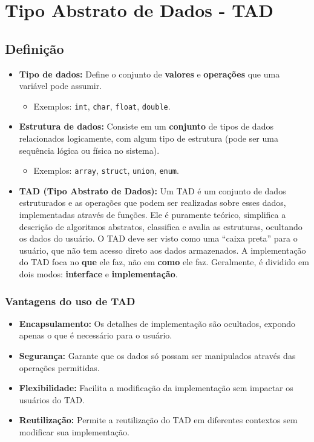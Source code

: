 \section{Tipo Abstrato de Dados - TAD}

\subsection{Definição}

\begin{itemize}
    \item \textbf{Tipo de dados:} Define o conjunto de \textbf{valores} e \textbf{operações} que uma variável pode assumir.
    \begin{itemize}
        \item Exemplos: \texttt{int}, \texttt{char}, \texttt{float}, \texttt{double}.
    \end{itemize}

    \item \textbf{Estrutura de dados:} Consiste em um \textbf{conjunto} de tipos de dados relacionados logicamente, com algum tipo de estrutura (pode ser uma sequência lógica ou física no sistema).
    \begin{itemize}
        \item Exemplos: \texttt{array}, \texttt{struct}, \texttt{union}, \texttt{enum}.
    \end{itemize}

    \item \textbf{TAD (Tipo Abstrato de Dados):} Um TAD é um conjunto de dados estruturados e as operações que podem ser realizadas sobre esses dados, implementadas através de funções. Ele é puramente teórico, simplifica a descrição de algoritmos abstratos, classifica e avalia as estruturas, ocultando os dados do usuário. O TAD deve ser visto como uma ``caixa preta'' para o usuário, que não tem acesso direto aos dados armazenados. A implementação do TAD foca no \textbf{que} ele faz, não em \textbf{como} ele faz. Geralmente, é dividido em dois modos: \textbf{interface} e \textbf{implementação}.
\end{itemize}

\subsubsection{Vantagens do uso de TAD}

\begin{itemize}
    \item \textbf{Encapsulamento:} Os detalhes de implementação são ocultados, expondo apenas o que é necessário para o usuário.
    \item \textbf{Segurança:} Garante que os dados só possam ser manipulados através das operações permitidas.
    \item \textbf{Flexibilidade:} Facilita a modificação da implementação sem impactar os usuários do TAD.
    \item \textbf{Reutilização:} Permite a reutilização do TAD em diferentes contextos sem modificar sua implementação.
\end{itemize}

